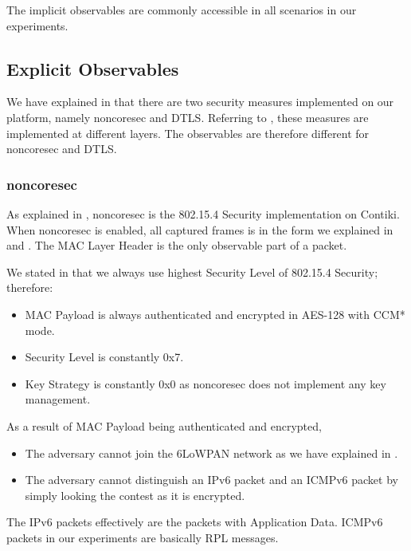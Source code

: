 The implicit observables are commonly accessible in all scenarios in our experiments.

\subsection{Explicit Observables}

We have explained in  that there are two security measures implemented on our platform, namely noncoresec and DTLS. Referring to , these measures are implemented at different layers. The observables are therefore different for noncoresec and DTLS. 

\subsubsection{noncoresec}

As explained in , noncoresec is the 802.15.4 Security implementation on Contiki. When noncoresec is enabled, all captured frames is in the form we explained in  and . The MAC Layer Header is the only observable part of a packet.

We stated in  that we always use highest Security Level of 802.15.4 Security; therefore:
\begin{itemize}
	\item MAC Payload is always authenticated and encrypted in AES-128 with CCM* mode.
	\item Security Level is constantly 0x7.
	\item Key Strategy is constantly 0x0 as noncoresec does not implement any key management.
\end{itemize}

As a result of MAC Payload being authenticated and encrypted, 
\begin{itemize}
	\item The adversary cannot join the 6LoWPAN network as we have explained in .
	\item The adversary cannot distinguish an IPv6 packet and an ICMPv6 packet by simply looking the contest as it is encrypted. 
\end{itemize}

The IPv6 packets effectively are the packets with Application Data. ICMPv6 packets in our experiments are basically RPL messages.

